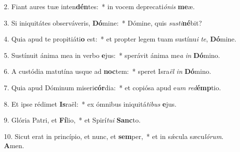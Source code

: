 2. Fiant aures tuæ inten\textbf{dén}tes:~*  in vocem deprecati\textit{ó}\textit{nis} \textbf{me}æ.\

3. Si iniquitátes observáveris, \textbf{Dó}mine:~*  Dómine, quis \textit{sus}\textit{ti}\textbf{né}bit?\

4. Quia apud te propitiáti\textbf{o} est:~*  et propter legem tuam sustínu\textit{i} \textit{te}, \textbf{Dó}mine.\

5. Sustínuit ánima mea in verbo \textbf{e}jus:~*  sperávit ánima me\textit{a} \textit{in} \textbf{Dó}mino.\

6. A custódia matutína usque ad \textbf{noc}tem:~*  speret Isra\textit{ël} \textit{in} \textbf{Dó}mino.\

7. Quia apud Dóminum miseri\textbf{cór}dia:~*  et copiósa apud e\textit{um} \textit{red}\textbf{émp}tio.\

8. Et ipse rédimet \textbf{Is}raël:~*  ex ómnibus iniquitá\textit{ti}\textit{bus} \textbf{e}jus.\

9. Glória Patri, et \textbf{Fí}lio,~*  et Spirí\textit{tu}\textit{i} \textbf{Sanc}to.\

10. Sicut erat in princípio, et nunc, et \textbf{sem}per,~*  et in sǽcula sæcu\textit{ló}\textit{rum}. \textbf{A}men.\

